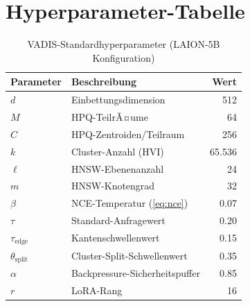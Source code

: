 ﻿\documentclass[12pt,a4paper]{article}
\begin{document}
\section{Hyperparameter-Tabelle}
\label{app:hyperparams}

\begin{table}[ht]
\centering
\small
\caption{VADIS-Standardhyperparameter (LAION-5B Konfiguration)}
\label{tab:hyperparams}
\begin{tabular}{@{}llr@{}}
\toprule
\textbf{Parameter} & \textbf{Beschreibung} & \textbf{Wert} \\
\midrule
$d$ & Einbettungsdimension & 512 \\
$M$ & HPQ-TeilrÃ¤ume & 64 \\
$C$ & HPQ-Zentroiden/Teilraum & 256 \\
$k$ & Cluster-Anzahl (HVI) & 65.536 \\
$\ell$ & HNSW-Ebenenanzahl & 24 \\
$m$ & HNSW-Knotengrad & 32 \\
$\beta$ & NCE-Temperatur (\cref{eq:nce}) & 0.07 \\
$\tau$ & Standard-Anfragewert & 0.20 \\
$\tau_{\text{edge}}$ & Kantenschwellenwert & 0.15 \\
$\theta_{\text{split}}$ & Cluster-Split-Schwellenwert & 0.35 \\
$\alpha$ & Backpressure-Sicherheitspuffer & 0.85 \\
$r$ & LoRA-Rang & 16 \\
\bottomrule
\end{tabular}
\end{table}
\end{document}
